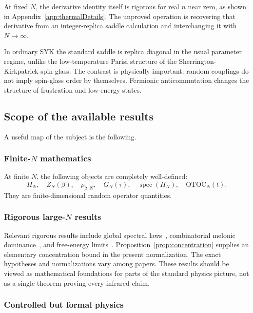 \documentclass[11pt]{article}
\numberwithin{equation}{section}
\theoremstyle{exposition}
\theoremstyle{result}
\newcommand{\OTOC}{\mathrm{OTOC}}
\begin{document}
At fixed $N$, the derivative identity itself is rigorous for real $n$ near zero, as shown in Appendix~\ref{app:thermalDetails}. The unproved operation is recovering that derivative from an integer-replica saddle calculation and interchanging it with $N\to\infty$.

In ordinary SYK the standard saddle is replica diagonal in the usual parameter regime, unlike the low-temperature Parisi structure of the Sherrington-Kirkpatrick spin glass. The contrast is physically important: random couplings do not imply spin-glass order by themselves. Fermionic anticommutation changes the structure of frustration and low-energy states.

\subsection{Scope of the available results}

A useful map of the subject is the following.

\subsubsection{Finite-$N$ mathematics}

At finite $N$, the following objects are completely well-defined:
\begin{equation*}
H_N,\quad Z_N(\beta),\quad \rho_{\beta,N},\quad G_N(\tau),\quad
\operatorname{spec}(H_N),\quad \OTOC_N(t).
\end{equation*}
They are finite-dimensional random operator quantities.

\subsubsection{Rigorous large-$N$ results}

Relevant rigorous results include global spectral laws~\cite{Feng}, combinatorial melonic dominance~\cite{Bonzom}, and free-energy limits~\cite{Gamarnik,He}. Proposition~\ref{prop:concentration} supplies an elementary concentration bound in the present normalization. The exact hypotheses and normalizations vary among papers. These results should be viewed as mathematical foundations for parts of the standard physics picture, not as a single theorem proving every infrared claim.

\subsubsection{Controlled but formal physics}
\end{document}
